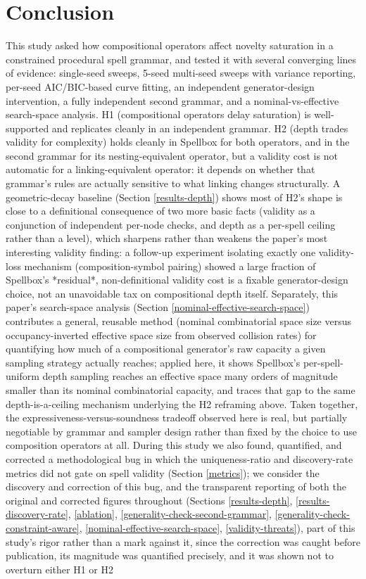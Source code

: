 \documentclass[]{article}
\begin{document}
        \section{Conclusion}\label{conclusion}

        This study asked how compositional operators affect novelty saturation in a constrained procedural spell grammar, and tested it with several converging lines of evidence: single-seed sweeps, 5-seed multi-seed sweeps with variance reporting, per-seed AIC/BIC-based curve fitting, an independent generator-design intervention, a fully independent second grammar, and a nominal-vs-effective search-space analysis. H1 (compositional operators delay saturation) is well-supported and replicates cleanly in an independent grammar. H2 (depth trades validity for complexity) holds cleanly in Spellbox for both operators, and in the second grammar for its nesting-equivalent operator, but a validity cost is not automatic for a linking-equivalent operator: it depends on whether that grammar's rules are actually sensitive to what linking changes structurally. A geometric-decay baseline (Section \ref{results-depth}) shows most of H2's shape is close to a definitional consequence of two more basic facts (validity as a conjunction of independent per-node checks, and depth as a per-spell ceiling rather than a level), which sharpens rather than weakens the paper's most interesting validity finding: a follow-up experiment isolating exactly one validity-loss mechanism (composition-symbol pairing) showed a large fraction of Spellbox's *residual*, non-definitional validity cost is a fixable generator-design choice, not an unavoidable tax on compositional depth itself. Separately, this paper's search-space analysis (Section \ref{nominal-effective-search-space}) contributes a general, reusable method (nominal combinatorial space size versus occupancy-inverted effective space size from observed collision rates) for quantifying how much of a compositional generator's raw capacity a given sampling strategy actually reaches; applied here, it shows Spellbox's per-spell-uniform depth sampling reaches an effective space many orders of magnitude smaller than its nominal combinatorial capacity, and traces that gap to the same depth-is-a-ceiling mechanism underlying the H2 reframing above. Taken together, the expressiveness-versus-soundness tradeoff observed here is real, but partially negotiable by grammar and sampler design rather than fixed by the choice to use composition operators at all. During this study we also found, quantified, and corrected a methodological bug in which the uniqueness-ratio and discovery-rate metrics did not gate on spell validity (Section \ref{metrics}); we consider the discovery and correction of this bug, and the transparent reporting of both the original and corrected figures throughout (Sections \ref{results-depth}, \ref{results-discovery-rate}, \ref{ablation}, \ref{generality-check-second-grammar}, \ref{generality-check-constraint-aware}, \ref{nominal-effective-search-space}, \ref{validity-threats}), part of this study's rigor rather than a mark against it, since the correction was caught before publication, its magnitude was quantified precisely, and it was shown not to overturn either H1 or H2 
\end{document}
